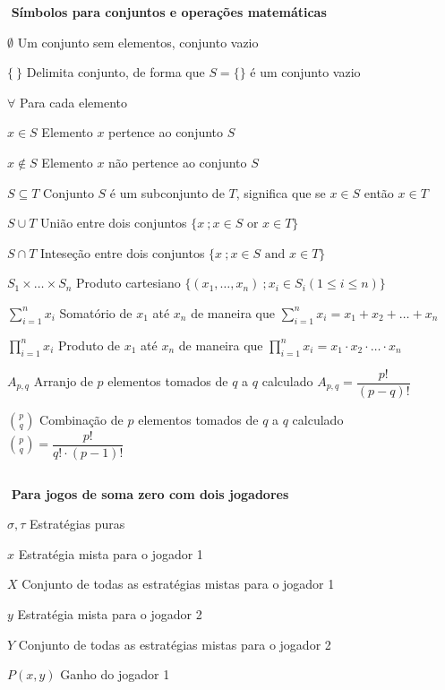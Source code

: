 \begin{simbolos}
	\item[$ $] \textbf{Símbolos para conjuntos e operações matemáticas}
	\item[$ \emptyset $] Um conjunto sem elementos, conjunto vazio
	\item[$ \{\ \} $] Delimita conjunto, de forma que $S = \{\}$ é um conjunto vazio
	\item[$ \forall $] Para cada elemento
	\item[$ x\in S $] Elemento $x$ pertence ao conjunto $S$
	\item[$ x\notin S $] Elemento $x$ não pertence ao conjunto $S$
	\item[$ S\subseteq T $] Conjunto $S$ é um subconjunto de $T$, significa que se $x\!\in\!S$ então $x\!\in\!T$
	\item[$ S\cup T $] União entre dois conjuntos $\{x\ ;x\!\in\!S \text{ or } x\!\in\!T\}$
	\item[$ S\cap T $] Inteseção entre dois conjuntos $\{x\ ;x\!\in\!S \text{ and } x\!\in\!T\}$
	\item[$ S_1\times\ldots\times S_n $] Produto cartesiano $\{(x_1,\ldots,x_n)\ ; x_i\!\in\!S_i (1\leq i\leq n)\}$

	\item[$ \displaystyle\sum_{i=1}^{n} x_i $] Somatório de $x_1$ até $x_n$ de maneira que $\displaystyle\sum_{i=1}^{n} x_i = x_1 + x_2 + \ldots + x_n$
	\item[$ \displaystyle\prod_{i=1}^{n} x_i $] Produto de $x_1$ até $x_n$ de maneira que $\displaystyle\prod_{i=1}^{n} x_i = x_1 \cdot x_2 \cdot \ldots \cdot x_n$
	\item[$ A_{p,q} $] Arranjo de $p$ elementos tomados de $q$ a $q$ calculado $A_{p,q}=\dfrac{p!}{(p-q)!}$
	\item[$ \binom{p}{q} $] Combinação de $p$ elementos tomados de $q$ a $q$ calculado $ \binom{p}{q}=\dfrac{p!}{q!\cdot (p-1)!} $
	\item[$ $]

	\item[$ $] \textbf{Para jogos de soma zero com dois jogadores}
	\item[$ \sigma,\tau $] Estratégias puras
	\item[$ x $] Estratégia mista para o jogador 1
	\item[$ X $] Conjunto de todas as estratégias mistas para o jogador 1
	\item[$ y $] Estratégia mista para o jogador 2
	\item[$ Y $] Conjunto de todas as estratégias mistas para o jogador 2
	\item[$ P(x,y) $] Ganho do jogador 1
	\item[$ $]


\end{simbolos}
